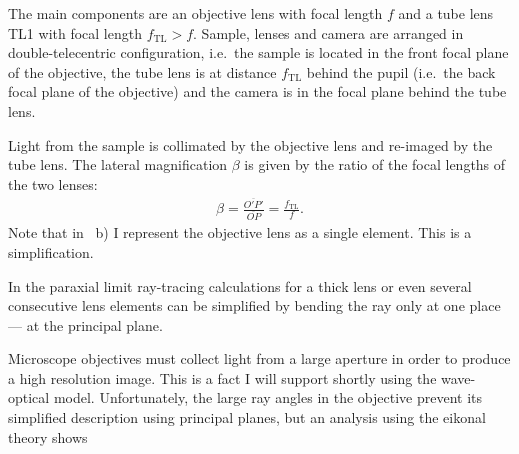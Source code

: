 The main components are an objective lens with focal length $f$ and a
 tube lens TL1 with focal length
$f_\textrm{TL}>f$. Sample, lenses and camera are arranged in
double-telecentric configuration, i.e.\ the sample is located in the
front focal plane of the objective, the tube lens is at distance
$f_\textrm{TL}$ behind the pupil (i.e.\ the back focal plane of the
objective) and the camera is in the focal plane behind the tube lens.




Light from the sample is collimated by the objective lens and
 re-imaged by the tube lens. The lateral
magnification $\beta$ is given by the ratio of the focal lengths of
the two lenses:
\begin{align}
  \beta=\frac{\overline{O'P'}}{\overline{OP}}=\frac{f_\mathrm{TL}}{f}. \label{eq:beta}
\end{align}
Note that in ~b) I represent the
objective lens as a single element.  This is a simplification.

In the paraxial limit ray-tracing calculations for a thick lens or
even several consecutive lens elements can be simplified by bending
the ray only at one place --- at the principal plane.





Microscope objectives must collect light from a large aperture in
 order to produce a high
resolution image. This is a fact I will support shortly using the
wave-optical model. Unfortunately, the large ray angles in the
objective prevent its simplified description using principal planes,
but an analysis using the eikonal theory \citep{Haferkorn1984} shows %


